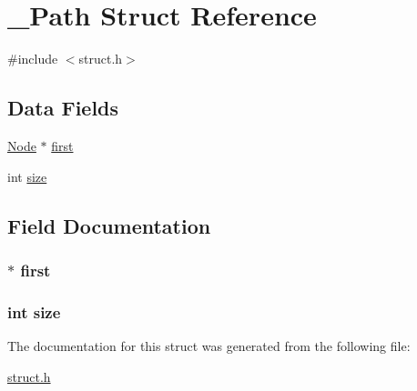 \hypertarget{struct___path}{}\section{\+\_\+\+Path Struct Reference}
\label{struct___path}


{\ttfamily \#include $<$struct.\+h$>$}

\subsection*{Data Fields}
\begin{DoxyCompactItemize}
\item 
\hyperlink{struct_8h_a8ff62746a396b270606ff04818b7e4ac}{Node} $\ast$ \hyperlink{struct___path_a2addc5f5fab651284199528b83cd61c8}{first}
\item 
int \hyperlink{struct___path_a439227feff9d7f55384e8780cfc2eb82}{size}
\end{DoxyCompactItemize}


\subsection{Field Documentation}
\subsubsection[{\texorpdfstring{first}{first}}]{$\ast$ first}\hypertarget{struct___path_a2addc5f5fab651284199528b83cd61c8}{}\label{struct___path_a2addc5f5fab651284199528b83cd61c8}
\subsubsection[{\texorpdfstring{size}{size}}]{\setlength{\rightskip}{0pt plus 5cm}int size}\hypertarget{struct___path_a439227feff9d7f55384e8780cfc2eb82}{}\label{struct___path_a439227feff9d7f55384e8780cfc2eb82}


The documentation for this struct was generated from the following file\+:\begin{DoxyCompactItemize}
\item 
\hyperlink{struct_8h}{struct.\+h}\end{DoxyCompactItemize}
